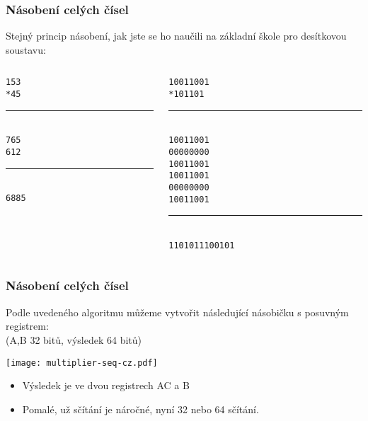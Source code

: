 \documentclass{beamer}
\begin{document}
\begin{frame}
\frametitle{Násobení celých čísel}

Stejný princip násobení, jak jste se ho naučili na základní škole pro desítkovou soustavu:
\begin{columns}
\begin{column}{0.4\textwidth}
\texttt{\phantom{xxx}153}\\
\texttt{\phantom{xxx}*45}\\
\vspace{-8pt}
\rule[0pt]{1.5cm}{0.1pt}\\
\texttt{\phantom{xxx}765}\\
\texttt{\phantom{xx}612 }\\
\vspace{-8pt}
\rule[0pt]{1.5cm}{0.1pt}\\
\texttt{\phantom{xx}6885}\\
\end{column}
\hfill
\begin{column}{0.4\textwidth}
\texttt{\phantom{xxxxxx}10011001}\\
\texttt{\phantom{xxxxxxx}*101101}\\
\vspace{-8pt}
\rule[0pt]{3cm}{0.4pt}\\
\texttt{\phantom{xxxxxx}10011001}\\
\texttt{\phantom{xxxxx}00000000}\\
\texttt{\phantom{xxxx}10011001}\\
\texttt{\phantom{xxx}10011001}\\
\texttt{\phantom{xx}00000000}\\
\texttt{\phantom{x}10011001}\\
\vspace{-8pt}
\rule[0pt]{3cm}{0.4pt}\\
\texttt{\phantom{x}1101011100101}\\
\end{column}
\end{columns}

\end{frame}

\begin{frame}
\frametitle{Násobení celých čísel}

Podle uvedeného algoritmu můžeme vytvořit následující násobičku s posuvným registrem:\\
(A,B 32 bitů, výsledek 64 bitů)
\begin{center}
\texttt{[image: multiplier-seq-cz.pdf]}
\end{center}
\begin{itemize}
\item Výsledek je ve dvou registrech AC a B 
\item Pomalé, už sčítání je náročné, nyní 32 nebo 64 sčítání.
\end{itemize}
\end{frame}
\end{document}
